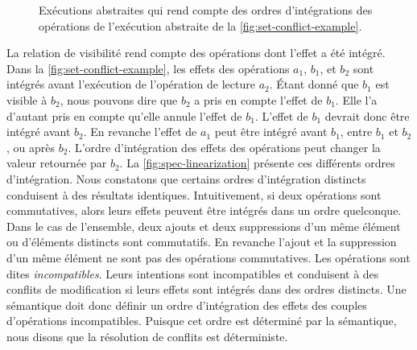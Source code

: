 \begin{figure}[htb]
\begin{subfigure}{\linewidth}
    \caption{}
\end{subfigure}
\caption[Impact d'ordres distincts d'intégration des opérations de modification sur un ensemble répliqué]{Exécutions abstraites qui rend compte des ordres d'intégrations des opérations de l'exécution abstraite de la \autoref{fig:set-conflict-example}.}\label{fig:spec-linearization}
\end{figure}

La relation de visibilité rend compte des opérations dont l'effet a été intégré.
Dans la \autoref{fig:set-conflict-example}, les effets des opérations $a_1$, $b_1$, et $b_2$ sont intégrés avant l'exécution de l'opération de lecture $a_2$.
Étant donné que $b_1$ est visible à $b_2$, nous pouvons dire que $b_2$ a pris en compte l'effet de $b_1$.
Elle l'a d'autant pris en compte qu'elle annule l'effet de $b_1$.
L'effet de $b_1$ devrait donc être intégré avant $b_2$.
En revanche l'effet de $a_1$ peut être intégré avant $b_1$, entre $b_1$ et $b_2$, ou après $b_2$.
L'ordre d'intégration des effets des opérations peut changer la valeur retournée par $b_2$.
La \autoref{fig:spec-linearization} présente ces différents ordres d'intégration.
Nous constatons que certains ordres d'intégration distincts conduisent à des résultats identiques.
Intuitivement, si deux opérations sont commutatives, alors leurs effets peuvent être intégrés dans un ordre quelconque.
Dans le cas de l'ensemble, deux ajouts et deux suppressions d'un même élément ou d'éléments distincts sont commutatifs.
En revanche l'ajout et la suppression d'un même élément ne sont pas des opérations commutatives.
Les opérations sont dites \emph{incompatibles}.
Leurs intentions sont incompatibles et conduisent à des conflits de modification si leurs effets sont intégrés dans des ordres distincts.
Une sémantique doit donc définir un ordre d'intégration des effets des couples d'opérations incompatibles.
Puisque cet ordre est déterminé par la sémantique, nous disons que la résolution de conflits est déterministe.

